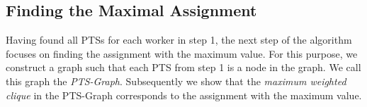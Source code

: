 
			
\subsection{Finding the Maximal Assignment}
\label{subsec:FindMM}
Having found all PTSs for each worker in step 1, the next step of the algorithm focuses on finding the assignment with the maximum value. For this purpose, we construct a graph such that each PTS from step 1 is a node in the graph. We call this graph the \emph{PTS-Graph}. Subsequently we show that the \emph{maximum weighted clique} in the PTS-Graph corresponds to the assignment with the maximum value.

